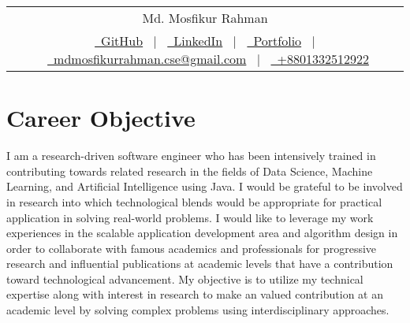 \documentclass[a4paper, 12pt]{article}
\begin{document}
\pagestyle{plain}

\begin{tabularx}{\linewidth}{@{} C @{}}
    	\Huge{Md. Mosfikur Rahman} \\[7.5pt]
	\href{https://github.com/mdmosfikurrahman}{\raisebox{-0.05\height}\faGithub\ GitHub} \ $|$ \            
	\href{https://linkedin.com/in/mdmosfikurrahman}{\raisebox{-0.05\height}\faLinkedin\ LinkedIn} \ $|$ \   
	\href{https://mdmosfikurrahman.github.io}{\raisebox{-0.05\height}\faGlobe \ Portfolio} \ $|$ \          
	\href{mailto:mdmosfikurrahman.cse@gmail.com}{\raisebox{-0.05\height}\faEnvelope \ mdmosfikurrahman.cse@gmail.com} \ $|$ \ 
    	\href{tel:+8801332512922}{\raisebox{-0.05\height}\faMobile \ +8801332512922}   \\
\end{tabularx}


\section{\textbf{Career Objective}}
	I am a research-driven software engineer who has been intensively trained in contributing
	towards related research in the fields of Data Science, Machine Learning, and Artificial
	Intelligence using Java. I would be grateful to be involved in research into
	which technological blends would be appropriate for practical application in
	solving real-world problems. I would like to leverage my work experiences in the
	scalable application development area and algorithm design in order to collaborate
	with famous academics and professionals for progressive research and influential
	publications at academic levels that have a contribution toward technological advancement.
	My objective is to utilize my technical expertise along with interest in
	research to make an valued contribution at an academic level by solving
	complex problems using interdisciplinary approaches.
\end{document}
